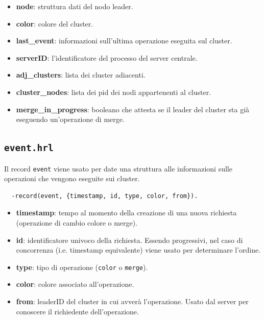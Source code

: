 \documentclass[12pt, a4paper]{report}
\begin{document}
\begin{itemize}
    \item \textbf{node}: struttura dati del nodo leader.
    \item \textbf{color}: colore del cluster.
    \item \textbf{last\_event}: informazioni sull'ultima operazione eseguita sul cluster.
    \item \textbf{serverID}: l'identificatore del processo del server centrale.
    \item \textbf{adj\_clusters}: lista dei cluster adiacenti.
    \item \textbf{cluster\_nodes}: lista dei pid dei nodi appartenenti al cluster.
    \item \textbf{merge\_in\_progress}: booleano che attesta se il leader del cluster sta gi\`a eseguendo un'operazione di merge.
\end{itemize}

\subsection{\texttt{event.hrl}}

Il record \texttt{event} viene usato per date una struttura alle informazioni sulle operazioni che vengono eseguite sui cluster.

\begin{tcolorbox}[title=Definizione del record \texttt{event}]
\begin{verbatim}
  -record(event, {timestamp, id, type, color, from}).
\end{verbatim}
\end{tcolorbox}

\begin{itemize}
    \item \textbf{timestamp}: tempo al momento della creazione di una nuova richiesta (operazione di cambio colore o merge).
    \item \textbf{id}: identificatore univoco della richiesta. Essendo progressivi, nel caso di concorrenza (i.e. timestamp equivalente) viene usato per determinare l'ordine.
    \item \textbf{type}: tipo di operazione (\texttt{color} o \texttt{merge}).
    \item \textbf{color}: colore associato all'operazione.
    \item \textbf{from}: leaderID del cluster in cui avver\`a l'operazione. Usato dal server per conoscere il richiedente dell'operazione.
\end{itemize}
\end{document}
